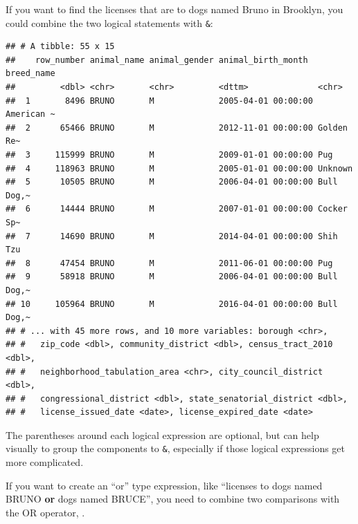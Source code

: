 \documentclass[]{Nemilov}
\newenvironment{Shaded}{\begin{snugshade}}{\end{snugshade}}
\newcommand{\KeywordTok}[1]{\textcolor[rgb]{0.13,0.29,0.53}{\textbf{#1}}}
\newcommand{\NormalTok}[1]{#1}
\newcommand{\OperatorTok}[1]{\textcolor[rgb]{0.81,0.36,0.00}{\textbf{#1}}}
\newcommand{\StringTok}[1]{\textcolor[rgb]{0.31,0.60,0.02}{#1}}
\begin{document}
If you want to find the licenses that are to dogs named Bruno in Brooklyn, you could combine the two logical statements with \texttt{\&}:

\begin{Shaded}
\end{Shaded}

\begin{verbatim}
## # A tibble: 55 x 15
##    row_number animal_name animal_gender animal_birth_month  breed_name
##         <dbl> <chr>       <chr>         <dttm>              <chr>     
##  1       8496 BRUNO       M             2005-04-01 00:00:00 American ~
##  2      65466 BRUNO       M             2012-11-01 00:00:00 Golden Re~
##  3     115999 BRUNO       M             2009-01-01 00:00:00 Pug       
##  4     118963 BRUNO       M             2005-01-01 00:00:00 Unknown   
##  5      10505 BRUNO       M             2006-04-01 00:00:00 Bull Dog,~
##  6      14444 BRUNO       M             2007-01-01 00:00:00 Cocker Sp~
##  7      14690 BRUNO       M             2014-04-01 00:00:00 Shih Tzu  
##  8      47454 BRUNO       M             2011-06-01 00:00:00 Pug       
##  9      58918 BRUNO       M             2006-04-01 00:00:00 Bull Dog,~
## 10     105964 BRUNO       M             2016-04-01 00:00:00 Bull Dog,~
## # ... with 45 more rows, and 10 more variables: borough <chr>,
## #   zip_code <dbl>, community_district <dbl>, census_tract_2010 <dbl>,
## #   neighborhood_tabulation_area <chr>, city_council_district <dbl>,
## #   congressional_district <dbl>, state_senatorial_district <dbl>,
## #   license_issued_date <date>, license_expired_date <date>
\end{verbatim}

The parentheses around each logical expression are optional, but can help visually to group the components to \texttt{\&}, especially if those logical expressions get more complicated.

If you want to create an ``or'' type expression, like ``licenses to dogs named BRUNO \textbf{or} dogs named BRUCE'', you need to combine two comparisons with the OR operator, \texttt{\textbar{}}.

\begin{Shaded}
\end{Shaded}
\end{document}
